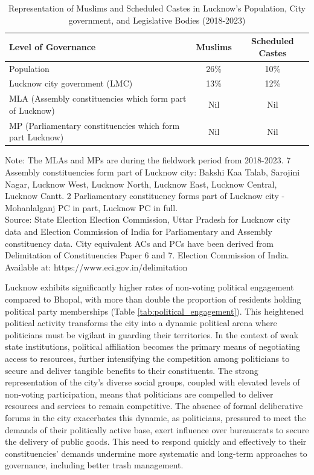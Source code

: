 \begin{table}[ht]
\centering
\caption{Representation of Muslims and Scheduled Castes in Lucknow's Population, City government, and Legislative Bodies (2018-2023)}
\label{tab:representation}
\begin{tabular}{|l|c|c|}
\hline
\textbf{Level of Governance} & \textbf{Muslims} & \textbf{Scheduled Castes} \\
\hline
Population & 26\% & 10\% \\
\hline
Lucknow city government (LMC) & 13\% & 12\% \\
\hline
MLA (Assembly constituencies which form part of Lucknow) & Nil & Nil \\
\hline
MP (Parliamentary constituencies which form part Lucknow) & Nil & Nil \\
\hline
\end{tabular}
\raggedright
\small Note: The MLAs and MPs are during the fieldwork period from 2018-2023. 7 Assembly constituencies form part of Lucknow city: Bakshi Kaa Talab, Sarojini Nagar, Lucknow West, Lucknow North, Lucknow East, Lucknow Central, Lucknow Cantt. 2 Parliamentary constituency forms part of Lucknow city - Mohanlalganj PC in part, Lucknow PC in full.\\
\small Source: State Election Election Commission, Uttar Pradesh for Lucknow city data and Election Commission of India for Parliamentary and Assembly constituency data. City equivalent ACs and PCs have been derived from Delimitation of Constituencies Paper 6 and 7. Election Commission of India. Available at: https://www.eci.gov.in/delimitation
\end{table}

Lucknow exhibits significantly higher rates of non-voting political engagement compared to Bhopal, with more than double the proportion of residents holding political party memberships (Table \ref{tab:political_engagement}). This heightened political activity transforms the city into a dynamic political arena where politicians must be vigilant in guarding their territories. In the context of weak state institutions, political affiliation becomes the primary means of negotiating access to resources, further intensifying the competition among politicians to secure and deliver tangible benefits to their constituents. The strong representation of the city's diverse social groups, coupled with elevated levels of non-voting participation, means that politicians are compelled to deliver resources and services to remain competitive. The absence of formal deliberative forums in the city exacerbates this dynamic, as politicians, pressured to meet the demands of their politically active base, exert influence over bureaucrats to secure the delivery of public goods. This need to respond quickly and effectively to their constituencies' demands undermine more systematic and long-term approaches to governance, including better trash management.

